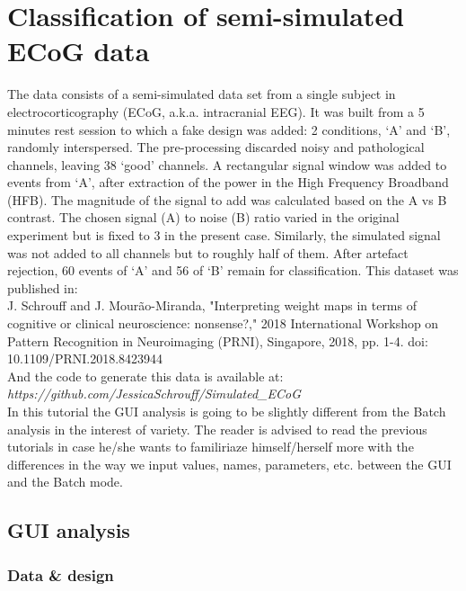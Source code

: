 
\chapter{Classification of semi-simulated ECoG data}
\minitoc
\label{semisimulated_ecog}


The data consists of a semi-simulated data set from a single subject in electrocorticography (ECoG, a.k.a. intracranial EEG). It was built from a 5 minutes rest session to which a fake design was added: 2 conditions, `A' and `B', randomly interspersed. The pre-processing discarded noisy and pathological channels, leaving 38 `good' channels. A rectangular signal window was added to events from `A', after extraction of the power in the High Frequency Broadband (HFB). The magnitude of the signal to add was calculated based on the A vs B contrast. The chosen signal (A) to noise (B) ratio varied in the original experiment but is fixed to 3 in the present case. Similarly, the simulated signal was not added to all channels but to roughly half of them. After artefact rejection, 60 events of ‘A’ and 56 of ‘B’ remain for classification. This dataset was published in:
\\

J. Schrouff and J. Mourão-Miranda, "Interpreting weight maps in terms of cognitive or clinical neuroscience: nonsense?," 2018 International Workshop on Pattern Recognition in Neuroimaging (PRNI), Singapore, 2018, pp. 1-4. doi: 10.1109/PRNI.2018.8423944
\\

And the code to generate this data is available at: \textit{https://github.com/JessicaSchrouff/Simulated\_ECoG}
\\

In this tutorial the GUI analysis is going to be slightly different from the Batch analysis in the interest of variety. The reader is advised to read the previous tutorials in case he/she wants to familiriaze himself/herself more with the differences in the way we input values, names, parameters, etc. between the GUI and the Batch mode.


\section{GUI analysis}
\subsection{Data \& design}
\label{sssec:data_and_design_semisim_gui}

